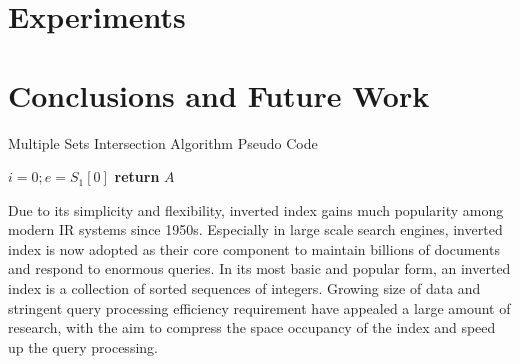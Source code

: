 \documentclass[runningheads,a4paper]{llncs}
\begin{document}
\section{Experiments}
\section{Conclusions and Future Work}

\begin{algorithm} \label{alg: merge blocks}
	\caption{Multiple Sets Intersection Algorithm Pseudo Code}
	$ i = 0; e = S_1[0] $\;
	\textbf{return} $ A $\;
\end{algorithm}

Due to its simplicity and flexibility, inverted index gains much popularity among modern IR systems since 1950s. Especially in large scale search engines, inverted index is now adopted as their core component to maintain billions of documents and respond to enormous queries. In its most basic and popular form, an inverted index is a collection of sorted sequences of integers\cite{manning2008introduction,witten1999managing,zobel2006inverted}. Growing size of data and stringent query processing efficiency requirement have appealed a large amount of research, with the aim to compress the space occupancy of the index and speed up the query processing.
\end{document}

